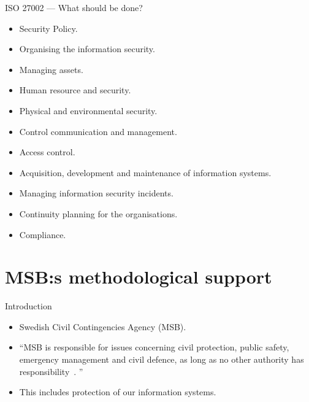 \documentclass{beamer}
\begin{document}
\begin{frame}{ISO 27002 --- What should be done?}
  \begin{itemize}
    \item Security Policy.
    \item Organising the information security.
    \item Managing assets.
    \item Human resource and security.
    \item Physical and environmental security.
    \item Control communication and management.
    \item Access control.
    \item Acquisition, development and maintenance of information systems.
    \item Managing information security incidents.
    \item Continuity planning for the organisations.
    \item Compliance.
  \end{itemize}
\end{frame}

\section[Methodilogical support]{MSB:s methodological support}
\begin{frame}{Introduction}{\insertsectionhead}
  \begin{itemize}
    \item Swedish Civil Contingencies Agency (MSB).
    \item \enquote{MSB is responsible for issues concerning civil protection,
        public safety, emergency management and civil defence, as long as no
        other authority has responsibility~\cite[About MSB]{msbse}\@.
        }
    \item This includes protection of our information systems.
  \end{itemize}
\end{frame}
\end{document}
